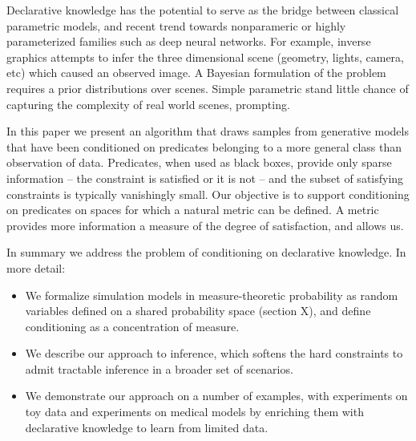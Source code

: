 Declarative knowledge has the potential to serve as the bridge between classical parametric models, and recent trend towards nonparameric or highly parameterized families such as deep neural networks.
For example, inverse graphics attempts to infer the three dimensional scene (geometry, lights, camera, etc) which caused an observed image.
A Bayesian formulation of the problem requires a prior distributions over scenes.
Simple parametric stand little chance of capturing the complexity of real world scenes, prompting.




In this paper we present an algorithm that draws samples from generative models that have been conditioned on predicates belonging to a more general class than observation of data.
Predicates, when used as black boxes, provide only sparse information -- the constraint is satisfied or it is not -- and the subset of satisfying constraints is typically vanishingly small.
Our objective is to support conditioning on predicates on spaces for which a natural metric can be defined.
A metric provides more information a measure of the degree of satisfaction, and allows us.

In summary we address the problem of conditioning on declarative knowledge.
In more detail:
\begin{itemize}
\item We formalize simulation models in measure-theoretic probability as random variables defined on a shared probability space (section X), and define conditioning as a concentration of measure.
\item We describe our approach to inference, which softens the hard constraints to admit tractable inference in a broader set of scenarios.
\item  We demonstrate our approach on a number of examples, with experiments on toy data and experiments on medical models by enriching them with declarative knowledge to learn from limited data.
\end{itemize}